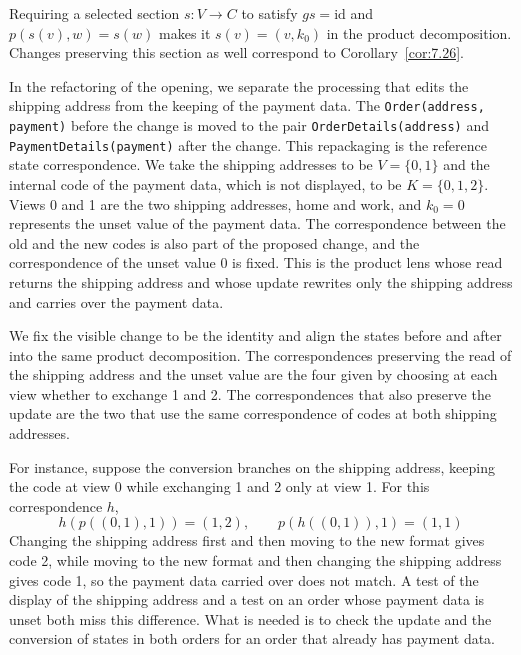 Requiring a selected section $s:V\to C$ to satisfy $gs=\mathrm{id}$ and
$p(s(v),w)=s(w)$ makes it $s(v)=(v,k_0)$ in the product decomposition.
Changes preserving this section as well correspond to Corollary~\ref{cor:7.26}.

\begin{example}\label{ex:7.28}

In the refactoring of the opening, we separate the processing that edits the shipping
address from the keeping of the payment data.
The \texttt{Order(address, payment)} before the change is moved to the pair
\texttt{OrderDetails(address)} and \texttt{PaymentDetails(payment)} after the change. This
repackaging is the reference state correspondence.
We take the shipping addresses to be $V=\{0,1\}$ and the internal code of the payment data,
which is not displayed, to be $K=\{0,1,2\}$.
Views 0 and 1 are the two shipping addresses, home and work, and $k_0=0$ represents the
unset value of the payment data.
The correspondence between the old and the new codes is also part of the proposed change,
and the correspondence of the unset value 0 is fixed.
This is the product lens whose read returns the shipping address and whose update rewrites
only the shipping address and carries over the payment data.

We fix the visible change to be the identity and align the states before and after into the
same product decomposition.
The correspondences preserving the read of the shipping address and the unset value are the
four given by choosing at each view whether to exchange 1 and 2.
The correspondences that also preserve the update are the two that use the same
correspondence of codes at both shipping addresses.

For instance, suppose the conversion branches on the shipping address, keeping the code at
view 0 while exchanging 1 and 2 only at view 1. For this correspondence $h$,
\begin{equation*}
h(p((0,1),1))=(1,2),\qquad
p(h((0,1)),1)=(1,1)
\tag{7.46}\label{eq:7.46}
\end{equation*}
Changing the shipping address first and then moving to the new format gives code 2, while
moving to the new format and then changing the shipping address gives code 1, so the payment
data carried over does not match.
A test of the display of the shipping address and a test on an order whose payment data is
unset both miss this difference.
What is needed is to check the update and the conversion of states in both orders for an
order that already has payment data.

\end{example}

